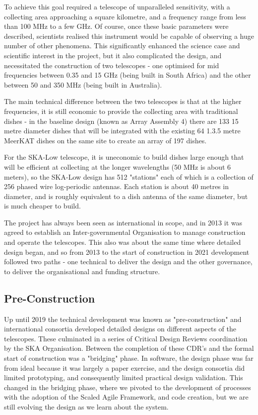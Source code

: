 \documentclass[a4paper,
               biblatex,     %
               keeplastbox,   %
               ]{jacow}
\begin{document}
To achieve this goal required a telescope of unparalleled sensitivity, with a collecting area approaching a square kilometre, and a frequency range from less than 100 MHz to a few GHz. Of course, once these basic parameters were described, scientists realised this instrument would be capable of observing a huge number of other phenomena. This significantly enhanced the science case and scientific interest in the project, but it also complicated the design, and necessitated the construction of two telescopes - one optimised for mid frequencies between 0.35 and 15 GHz (being built in South Africa) and the other between 50 and 350 MHz (being built in Australia). 

The main technical difference between the two telescopes is that at the higher frequencies, it is still economic to provide the collecting area with traditional dishes - in the baseline design (known as Array Assembly 4) there are 133 15 metre diameter dishes that will be integrated with the existing 64 1.3.5 metre MeerKAT dishes on the same site to create an array of 197 dishes.

For the SKA-Low telescope, it is uneconomic to build dishes large enough that will be efficient at collecting at the longer wavelengths (50 MHz is about 6 meters), so the SKA-Low design has 512 "stations" each of which is a collection of 256 phased wire log-periodic antennas. Each station is about 40 metres in diameter, and is roughly equivalent to a dish antenna of the same diameter, but is much cheaper to build.

The project has always been seen as international in scope, and in 2013 it was agreed to establish an Inter-governmental Organisation to manage construction and operate the telescopes. This also was about the same time where detailed design began, and so from 2013 to the start of construction in 2021 development followed two paths - one technical to deliver the design and the other governance, to deliver the organisational and funding structure.

\subsection{Pre-Construction}
Up until 2019 the technical development was known as "pre-construction" and international consortia developed detailed designs on different aspects of the telescopes. These culminated in a series of Critical Design Reviews coordination by the SKA Organisation. Between the completion of these CDR's and the formal start of construction was a "bridging" phase. In software, the design phase was far from ideal because it was largely a paper exercise, and the design consortia did limited prototyping, and consequently limited practical design validation. This changed in the bridging phase, where we pivoted to the development of processes with the adoption of the Scaled Agile Framework, and code creation, but we are still evolving the design as we learn about the system.
\end{document}
